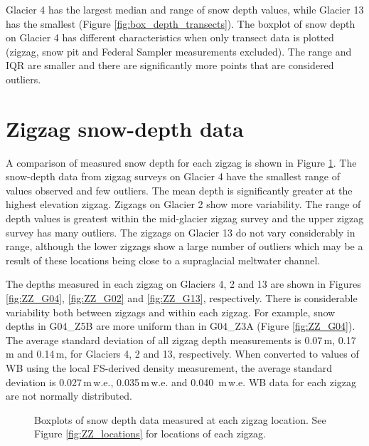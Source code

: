\documentclass{sfuthesis}
\begin{document}
Glacier 4 has the largest median and range of snow depth values, while Glacier 13 has the smallest (Figure \ref{fig:box_depth_transects}). The boxplot of snow depth on Glacier 4 has different characteristics when only transect data is plotted (zigzag, snow pit and Federal Sampler measurements excluded). The range and IQR are smaller and there are significantly more points that are considered outliers. 

\section{Zigzag snow-depth data}

A comparison of measured snow depth for each zigzag is shown in Figure \ref{fig:ZZ_boxplot}. The snow-depth data from zigzag surveys on Glacier 4 have the smallest range of values observed and few outliers. The mean depth is significantly greater at the highest elevation zigzag. Zigzags on Glacier 2 show more variability. The range of depth values is greatest within the mid-glacier zigzag survey and the upper zigzag survey has many outliers. The zigzags on Glacier 13 do not vary considerably in range, although the lower zigzags show a large number of outliers which may be a result of these locations being close to a supraglacial meltwater channel. 

The depths measured in each zigzag on Glaciers 4, 2 and 13 are shown in Figures \ref{fig:ZZ_G04}, \ref{fig:ZZ_G02} and \ref{fig:ZZ_G13}, respectively. There is considerable variability both between zigzags and within each zigzag. For example, snow depths in G04\_Z5B are more uniform than in G04\_Z3A (Figure \ref{fig:ZZ_G04}). The average standard deviation of all zigzag depth measurements is 0.07\,m, 0.17\,m and 0.14\,m, for Glaciers 4, 2 and 13, respectively. When converted to values of WB using the local FS-derived density measurement, the average standard deviation is 0.027\,m\,w.e., 0.035\,m\,w.e. and 0.040 \,m\,w.e. WB data for each zigzag are not normally distributed.

\begin{figure}[H]
	\centering
	\caption{Boxplots of snow depth data measured at each zigzag location. See Figure \ref{fig:ZZ_locations} for locations of each zigzag.}
	\label{fig:ZZ_boxplot}
\end{figure}
\end{document}
